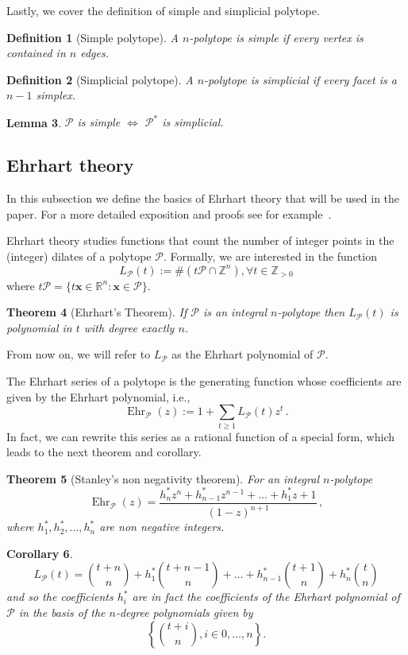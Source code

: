 \documentclass[a4paper,11pt,reqno]{amsart}
\DeclareMathOperator{\Ehr}{Ehr}
\newtheorem{theorem}{Theorem}[section]
\newtheorem{lemma}[theorem]{Lemma}
\newtheorem{corollary}[theorem]{Corollary}
\newtheorem{definition}[theorem]{Definition}
\begin{document}
Lastly, we cover the definition of simple and simplicial polytope.
\begin{definition}[Simple polytope]\label{def:simple}
A $n$-polytope is simple if every vertex is contained in $n$ edges.
\end{definition}
\begin{definition}[Simplicial polytope]\label{def:simplicial}
A $n$-polytope is simplicial if every facet is a $n-1$ simplex.
\end{definition}
\begin{lemma}
$\mathcal{P}$ is simple $\Leftrightarrow$ $\mathcal{P}^*$ is simplicial.
\end{lemma}

\subsection{Ehrhart theory}
\label{ssec:Ehrhart}

In this subsection we define the basics of Ehrhart theory that will be used in the paper. For a more detailed exposition 
and proofs see for example~\cite{BR}.

Ehrhart theory studies functions that count the number of integer points in the (integer) dilates of a polytope $\mathcal{P}$. 
Formally, we are interested in the function
\[
L_{\mathcal{P}}(t) := \#(t\mathcal{P} \cap \mathbb{Z}^n), \forall t \in \mathbb{Z}_{> 0}
\]
where $t\mathcal{P}=\{t \bm{x} \in \mathbb{R}^n: \bm{x} \in \mathcal{P}\}$.
\begin{theorem}[Ehrhart's Theorem]
If $\mathcal{P}$ is an integral $n$-polytope then $L_{\mathcal{P}}(t)$ is polynomial in $t$ with degree exactly $n$. 
\end{theorem}
\noindent From now on, we will refer to $L_\mathcal{P}$ as the Ehrhart polynomial of $\mathcal{P}$.

The Ehrhart series of a polytope is the generating function whose coefficients are given by the Ehrhart polynomial, i.e.,
\[
\Ehr_{\mathcal{P}}(z):=1+\sum_{t \geq 1} L_{\mathcal{P}}(t) z^t \,.
\]
In fact, we can rewrite this series as a rational function of a special form, which leads to the next theorem and corollary.
\begin{theorem}[Stanley's non negativity theorem]\label{thm:stanley}
For an integral $n$-polytope
\[
\Ehr_{\mathcal{P}}(z)=\frac{h^*_n z^n + h^*_{n-1} z^{n-1} + \dots + h^*_1 z + 1}{(1-z)^{n+1}}\,,
\]
where $h_1^*, h_2^*, \dots, h_n^*$ are non negative integers.
\end{theorem}
\begin{corollary}
\[
L_{\mathcal{P}}(t) = {t+n \choose n} + h_1^* {t+n-1 \choose n} + \dots + h_{n-1}^* {t+1 \choose n} + h_n^* {t \choose n}
\]
and so the coefficients $h_i^*$ are in fact the coefficients of the Ehrhart polynomial of $\mathcal{P}$ in the basis of the 
$n$-degree polynomials given by
\[
\left\{ {t+i\choose n}, i\in 0,\dots, n \right\}.
\]
\end{corollary}
\end{document}
